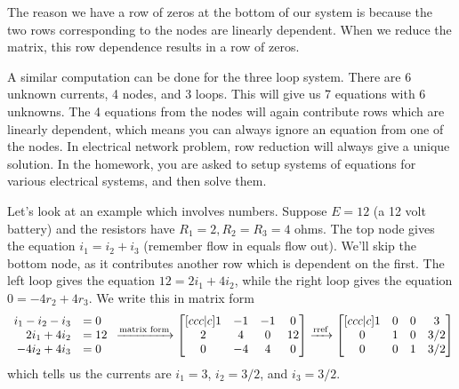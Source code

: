 The reason we have a row of zeros at the bottom of our system is because the two rows corresponding to the nodes are linearly dependent.  
When we reduce the matrix, this row dependence results in a row of zeros.

A similar computation can be done for the three loop system. 
There are 6 unknown currents, 4 nodes, and 3 loops.  
This will give us 7 equations with 6 unknowns.  
The 4 equations from the nodes will again contribute rows which are linearly dependent, which means you can always ignore an equation from one of the nodes. 
In electrical network problem, row reduction will always give a unique solution. 
In the homework, you are asked to setup systems of equations for various electrical systems, and then solve them. 


\begin{example} \label{electrical example}Let's look at an example which involves numbers.  Suppose $E=12$ (a 12 volt battery) and the resistors have $R_1=2, R_2=R_3=4$ ohms. The top node gives the equation $i_1=i_2+i_3$ (remember flow in equals flow out). We'll skip the bottom node, as it contributes another row which is dependent on the first.  The left loop gives the equation $12 = 2i_1+4i_2$, while the right loop gives the equation $0=-4r_2+4r_3$.  We write this in matrix form
$$
\begin{array}{rl}
i_1-i_2-i_3&=0\\
2i_1+4i_2&=12\\
-4 i_2 +4i_3&=0
\end{array}
\xrightarrow{\text{matrix form}}
\begin{bmatrix}[ccc|c]
1&-1&-1&0\\
2&4&0&12\\
0&-4&4&0
\end{bmatrix}
\xrightarrow{\operatorname{rref}}
\begin{bmatrix}[ccc|c]
 1 & 0 & 0 & 3\\
 0 & 1 & 0 & 3/2\\
 0 & 0 & 1 & 3/2
\end{bmatrix}
$$
which tells us the currents are $i_1=3$, $i_2=3/2$, and $i_3=3/2$.
\end{example}






